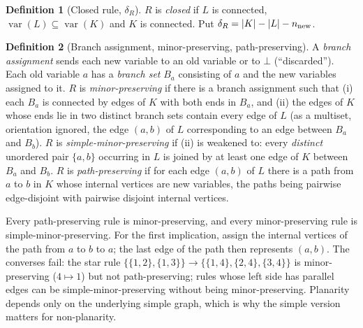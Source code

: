 \documentclass[10pt]{article}
\theoremstyle{definition}
\newtheorem{definition}{Definition}
\theoremstyle{plain}
\theoremstyle{remark}
\DeclareMathOperator{\var}{var}
\begin{document}
\begin{definition}[Closed rule, $\delta_R$]\label{def:closed}
$R$ is \emph{closed} if $L$ is connected, $\var(L)\subseteq\var(K)$ and $K$ is connected. Put $\delta_R=|K|-|L|-n_{\rm new}$.
\end{definition}

\begin{definition}[Branch assignment, minor-preserving, path-preserving]\label{def:minor}
A \emph{branch assignment} sends each new variable to an old variable or to $\bot$ (``discarded''). Each old variable $a$ has a \emph{branch set} $B_a$ consisting of $a$ and the new variables assigned to it. $R$ is \emph{minor-preserving} if there is a branch assignment such that (i) each $B_a$ is connected by edges of $K$ with both ends in $B_a$, and (ii) the edges of $K$ whose ends lie in two distinct branch sets contain every edge of $L$ (as a multiset, orientation ignored, the edge $(a,b)$ of $L$ corresponding to an edge between $B_a$ and $B_b$). $R$ is \emph{simple-minor-preserving} if (ii) is weakened to: every \emph{distinct} unordered pair $\{a,b\}$ occurring in $L$ is joined by at least one edge of $K$ between $B_a$ and $B_b$. $R$ is \emph{path-preserving} if for each edge $(a,b)$ of $L$ there is a path from $a$ to $b$ in $K$ whose internal vertices are new variables, the paths being pairwise edge-disjoint with pairwise disjoint internal vertices.
\end{definition}
\noindent Every path-preserving rule is minor-preserving, and every minor-preserving rule is simple-minor-preserving. For the first implication, assign the internal vertices of the path from $a$ to $b$ to $a$; the last edge of the path then represents $(a,b)$. The converses fail: the star rule $\{\{1,2\},\{1,3\}\}\to\{\{1,4\},\{2,4\},\{3,4\}\}$ is minor-preserving ($4\mapsto1$) but not path-preserving; rules whose left side has parallel edges can be simple-minor-preserving without being minor-preserving. Planarity depends only on the underlying simple graph, which is why the simple version matters for non-planarity.
\end{document}
